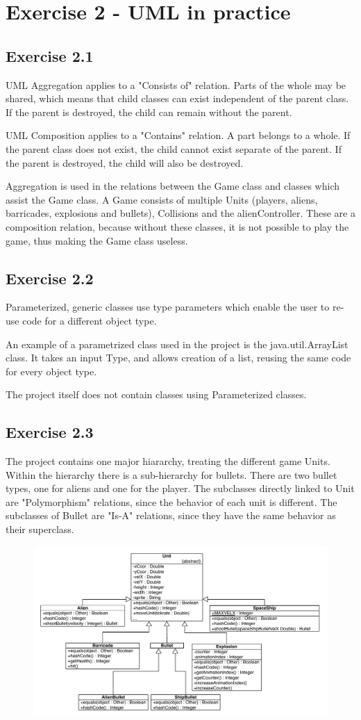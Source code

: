 \documentclass[10pt]{article}
\begin{document}
\section{Exercise 2 - UML in practice}
\subsection{Exercise 2.1}
UML Aggregation applies to a "Consists of" relation.
Parts of the whole may be shared, which means that child classes can exist independent of the parent class.
If the parent is destroyed, the child can remain without the parent.

UML Composition applies to a "Contains" relation.
A part belongs to a whole. If the parent class does not exist, the child cannot exist separate of the parent. 
If the parent is destroyed, the child will also be destroyed.

Aggregation is used in the relations between the Game class and classes which assist the Game class.
A Game consists of multiple Units (players, aliens, barricades, explosions and bullets), Collisions and the alienController. These are a composition relation, because without these classes, it is not possible to play the game, thus making the Game class useless.

\subsection{Exercise  2.2}
Parameterized, generic classes use type parameters which enable the user to re-use code for a different object type. 

An example of a parametrized class used in the project is the java.util.ArrayList class.
It takes an input Type, and allows creation of a list, reusing the same code for every object type.

The project itself does not contain classes using Parameterized classes.

\subsection{Exercise  2.3}
The project contains one major hiararchy, treating the different game Units. 
Within the hierarchy there is a sub-hierarchy for bullets. There are two bullet types, one for aliens and one for the player.
The subclasses directly linked to Unit are "Polymorphism" relations, since the behavior of each unit is different.
The subclasses of Bullet are "Is-A" relations, since they have the same behavior as their superclass.

\begin{figure}[ht!]
\includegraphics[width=1.1\textwidth]{SI-UMLhierarchies.pdf}
\end{figure}
\end{document}
